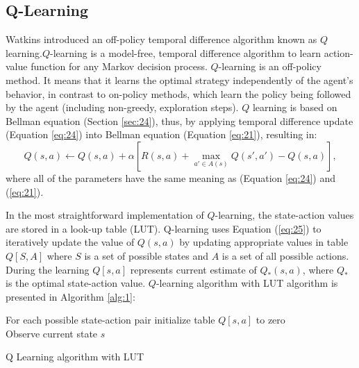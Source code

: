         \subsection{Q-Learning} \label{sec:253}
            Watkins \cite{Watkins:1989} introduced an off-policy temporal difference algorithm known as $Q$learning.$Q$-learning is a model-free, temporal difference algorithm to learn action-value function for any Markov decision process. $Q$-learning is an off-policy method. It means that it learns the optimal strategy independently of the agent's behavior, in contrast to on-policy methods, which learn the policy being followed by the agent (including non-greedy, exploration steps). $Q$ learning is based on Bellman equation (Section \ref{sec:24}), thus, by applying temporal difference update (Equation \ref{eq:24}) into Bellman equation (Equation \ref{eq:21}), resulting in:
            \begin{equation}\label{eq:25}
                Q(s,a) \gets Q(s,a) + \alpha[R(s,a)+ \max_{a' \in A(s)} Q(s',a')-Q(s,a)], 
            \end{equation}
            where all of the parameters have the same meaning as (Equation \ref{eq:24}) and (\ref{eq:21}).
            \par
            In the most straightforward implementation of $Q$-learning, the state-action values are stored in a look-up table (LUT). Q-learning uses Equation (\ref{eq:25}) to iteratively update the value of $Q(s, a)$ by updating appropriate values in table $Q[S, A]$ where $S$ is a set of possible states and $A$ is a set of all possible actions. During the learning $Q[s, a]$ represents current estimate of $Q_*(s, a)$, where $Q_*$ is the optimal state-action value.
            $Q$-learning algorithm with LUT algorithm is presented in Algorithm \ref{alg:1}:
            \par
            \begin{algorithm}[H]\label{alg:1}
                For each possible state-action pair initialize table $Q[s,a]$ to zero\\
                Observe current state $s$\\
            
            \caption{Q Learning algorithm with LUT}
            \end{algorithm}
            \vspace{5mm}
            
